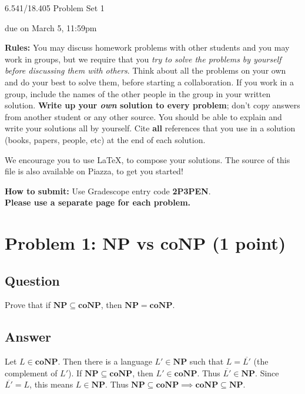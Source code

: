 \documentclass{article}
\newcommand{\NP}{\mathbf{NP}}
\newcommand{\coNP}{\mathbf{coNP}}
\begin{document}
	
	
	\begin{center}
		\Large
		6.541/18.405 Problem Set 1
		
		\vspace{3pt}
		\normalsize
		due on March 5, 11:59pm
	\end{center}
	
	{\bf Rules:} You may discuss homework problems with other students and you may work in groups, but we require that you {\em try to solve the problems by yourself before discussing them with others}. Think about all the problems on your own and do your best to solve them, before starting a collaboration. If you work in a group, include the names of the other people in the group in your written solution. {\bf Write up your {\em own} solution to every problem}; don't copy answers from another student or any other source. You should be able to explain and write your solutions all by yourself. Cite {\bf all} references that you use in a solution (books, papers, people, etc) at the end of each solution. 
	
	We encourage you to use \LaTeX, to compose your solutions. The source of this file is also available on Piazza, to get you started!
	
	{\bf How to submit:} Use Gradescope entry code \textbf{2P3PEN}.\\ \textbf{Please use a separate page for each problem.} 

\section*{Problem 1: NP vs coNP (1 point)}

\subsection*{Question}

Prove that if $\NP \subseteq \coNP$, then $\NP = \coNP$.

\subsection*{Answer}

Let $L \in \coNP$.  Then there is a language $L' \in \NP$
such that $L = \overline{L'}$ (the complement of $L'$).
If $\NP \subseteq \coNP$, then $L' \in \coNP$.
Thus $\overline{L'} \in \NP$.  Since $\overline{L'} = L$, this means
$L \in \NP$. Thus $\NP \subseteq \coNP \implies \coNP \subseteq \NP$.
\end{document}
